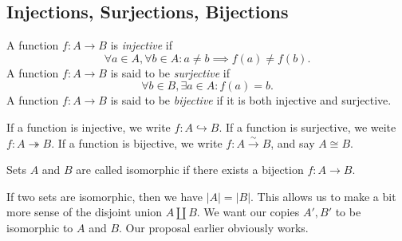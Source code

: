 \subsection{Injections, Surjections, Bijections}
\begin{definition}\label{dfn:1.2.3}
	A function $f : A \to B$ is \emph{injective} if
\[
	\forall a\in A, \forall b\in A: a\neq b\implies f(a)\neq f(b)
.\]
	A function $f : A \to B$ is said to be \emph{surjective} if
	\[
		\forall b\in B,\exists a\in A:f(a)=b
	.\]
	A function $f : A \to B$ is said to be \emph{bijective} if it is both injective and surjective.
\end{definition}
If a function is injective, we write $f : A \hookrightarrow B$. If a function is surjective, we weite $f : A \twoheadrightarrow B$. If a function is bijective, we write $f : A \overset{\sim}{\to} B$, and say $A\cong B$.
\begin{definition}\label{dfn:1.2.4}
	Sets $A$ and $B$ are called isomorphic if there exists a bijection $f : A \to B$.
\end{definition}
If two sets are isomorphic, then we have $\left| A \right| =\left| B \right| $. This allows us to make a bit more sense of the disjoint union $A\amalg B$. We want our copies $A',B'$ to be isomorphic to $A$ and $B$. Our proposal earlier obviously works.
